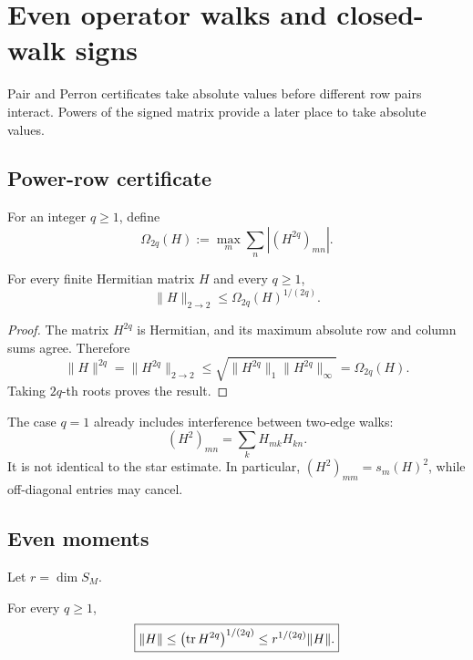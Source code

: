 \section{Even operator walks and closed-walk signs}
\label{sec:tpc68-operator-walks}

Pair and Perron certificates take absolute values before different row
pairs interact.  Powers of the signed matrix provide a later place to take
absolute values.

\subsection{Power-row certificate}

For an integer \(q\ge1\), define
\begin{equation}
 \Omega_{2q}(H)
 :=
 \max_m\sum_n|(H^{2q})_{mn}|.
 \label{eq:tpc68-Omega-power}
\end{equation}

\begin{theorem}
\label{thm:tpc68-even-walk-certificate}
For every finite Hermitian matrix \(H\) and every \(q\ge1\),
\begin{equation}
 \boxed{
 \|H\|_{2\to2}
 \le\Omega_{2q}(H)^{1/(2q)}.}
 \label{eq:tpc68-even-walk-bound}
\end{equation}
\end{theorem}

\begin{proof}
The matrix \(H^{2q}\) is Hermitian, and its maximum absolute row and column
sums agree.  Therefore
\[
 \|H\|^{2q}
 =\|H^{2q}\|_{2\to2}
 \le\sqrt{\|H^{2q}\|_1\|H^{2q}\|_\infty}
 =\Omega_{2q}(H).
\]
Taking \(2q\)-th roots proves the result.
\end{proof}

The case \(q=1\) already includes interference between two-edge walks:
\[
 (H^2)_{mn}=\sum_kH_{mk}H_{kn}.
\]
It is not identical to the star estimate.  In particular,
\((H^2)_{mm}=s_m(H)^2\), while off-diagonal entries may cancel.

\subsection{Even moments}

Let \(r=\dim S_M\).

\begin{theorem}
\label{thm:tpc68-even-moment}
For every \(q\ge1\),
\begin{equation}
 \boxed{
 \|H\|
 \le\bigl(\operatorname{tr} H^{2q}\bigr)^{1/(2q)}
 \le r^{1/(2q)}\|H\|.}
 \label{eq:tpc68-even-moment-bound}
\end{equation}
\end{theorem}

